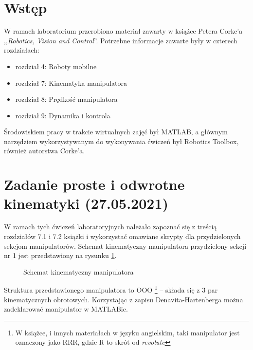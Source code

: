 \documentclass[11pt, a4paper]{article}
\begin{document}



%
%

\section*{Wstęp}

W ramach laboratorium przerobiono materiał zawarty w książce Petera Corke'a ,,\emph{Robotics, Vision and Control}''. Potrzebne informacje zawarte były w czterech rozdziałach:
\begin{itemize}
    \item rozdział 4: Roboty mobilne
    \item rozdział 7: Kinematyka manipulatora
    \item rozdział 8: Prędkość manipulatora
    \item rozdział 9: Dynamika i kontrola
\end{itemize}

Środowiskiem pracy w trakcie wirtualnych zajęć był MATLAB, a głównym narzędziem wykorzystywanym do wykonywania ćwiczeń był Robotics Toolbox, również autorstwa Corke'a.

\newpage



%
%

\section{Zadanie proste i odwrotne kinematyki (27.05.2021)}

W ramach tych ćwiczeń laboratoryjnych należało zapoznać się z treścią rozdziałów 7.1 i 7.2 książki i wykorzystać omawiane skrypty dla przydzielonych sekcjom manipulatorów. Schemat kinematyczny manipulatora przydzielony sekcji nr 1 jest przedstawiony na rysunku \ref{fig:manipulator}.
\begin{figure}[htbp!]
	\centering
	\caption{Schemat kinematyczny manipulatora \label{fig:manipulator}}
\end{figure}

Struktura przedstawionego manipulatora to OOO%
\footnote{W książce, i innych materiałach w języku angielskim, taki manipulator jest oznaczony jako RRR, gdzie R to skrót od \emph{revolute}}
 -- składa się z 3 par kinematycznych obrotowych. Korzystając z zapisu Denavita-Hartenberga można zadeklarować manipulator w MATLABie.
\end{document}
